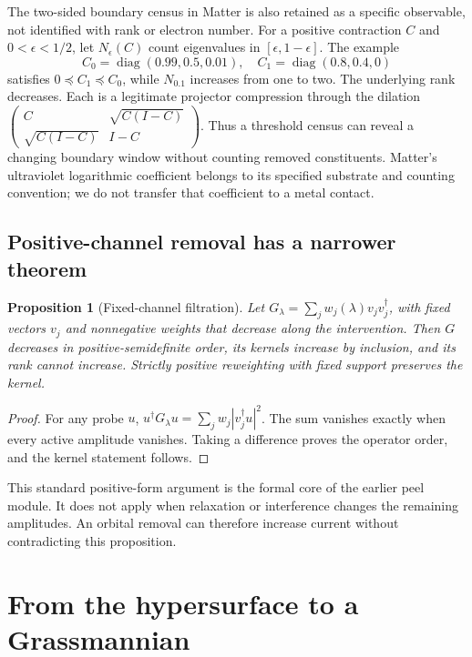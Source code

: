 \documentclass[11pt]{article}
\newtheorem{proposition}{Proposition}
\begin{document}
The two-sided boundary census in Matter is also retained as a specific observable, not identified with rank or electron number. For a positive contraction $C$ and $0<\epsilon<1/2$, let $N_\epsilon(C)$ count eigenvalues in $[\epsilon,1-\epsilon]$. The example
\begin{equation}
C_0=\operatorname{diag}(0.99,0.5,0.01),\quad
C_1=\operatorname{diag}(0.8,0.4,0)
\end{equation}
satisfies $0\preceq C_1\preceq C_0$, while $N_{0.1}$ increases from one to two. The underlying rank decreases. Each is a legitimate projector compression through the dilation
$\left(\begin{smallmatrix}C&\sqrt{C(I-C)}\\\sqrt{C(I-C)}&I-C\end{smallmatrix}\right)$.
Thus a threshold census can reveal a changing boundary window without counting removed constituents. Matter's ultraviolet logarithmic coefficient belongs to its specified substrate and counting convention; we do not transfer that coefficient to a metal contact.

\subsection{Positive-channel removal has a narrower theorem}
\begin{proposition}[Fixed-channel filtration]
Let $G_\lambda=\sum_j w_j(\lambda)v_jv_j^\dagger$, with fixed vectors $v_j$ and nonnegative weights that decrease along the intervention. Then $G$ decreases in positive-semidefinite order, its kernels increase by inclusion, and its rank cannot increase. Strictly positive reweighting with fixed support preserves the kernel.
\end{proposition}
\begin{proof}
For any probe $u$, $u^\dagger G_\lambda u=\sum_jw_j|v_j^\dagger u|^2$. The sum vanishes exactly when every active amplitude vanishes. Taking a difference proves the operator order, and the kernel statement follows.\end{proof}
This standard positive-form argument is the formal core of the earlier peel module. It does not apply when relaxation or interference changes the remaining amplitudes. An orbital removal can therefore increase current without contradicting this proposition.

\section{From the hypersurface to a Grassmannian}
\end{document}
